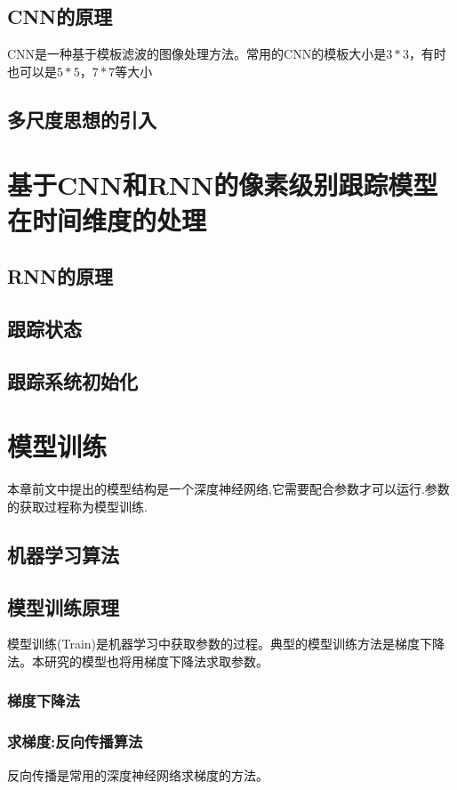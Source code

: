 \subsection{CNN的原理}
CNN是一种基于模板滤波的图像处理方法。常用的CNN的模板大小是$3*3$，有时也可以是$5*5$，$7*7$等大小
\subsection{多尺度思想的引入}
\section{基于CNN和RNN的像素级别跟踪模型在时间维度的处理}
\subsection{RNN的原理}
\subsection{跟踪状态}
\subsection{跟踪系统初始化}


\section{模型训练}
本章前文中提出的模型结构是一个深度神经网络,它需要配合参数才可以运行.参数的获取过程称为模型训练.

\subsection{机器学习算法}

\subsection{模型训练原理}
模型训练(Train)是机器学习中获取参数的过程。典型的模型训练方法是梯度下降法。本研究的模型也将用梯度下降法求取参数。
\subsubsection{梯度下降法}

\subsubsection{求梯度:反向传播算法}
反向传播是常用的深度神经网络求梯度的方法。